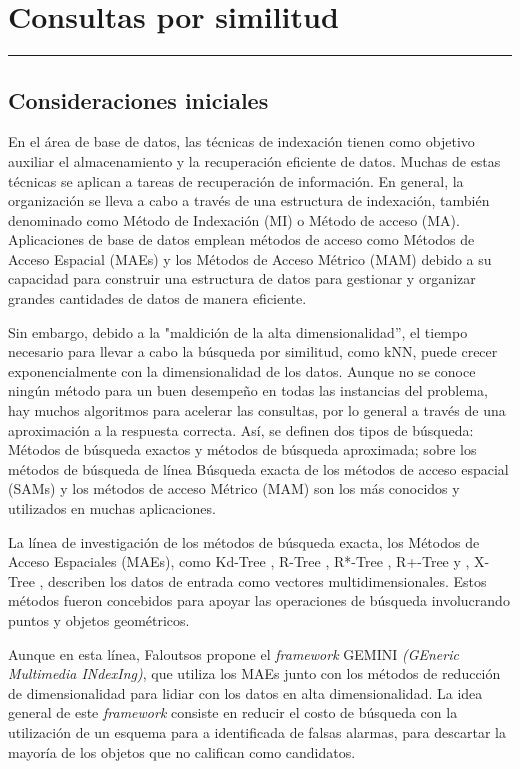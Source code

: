\chapter{Consultas por similitud}
\hrule \bigskip \vspace*{1cm}


\section{Consideraciones iniciales}

En el área de base de datos, las técnicas de indexación tienen como objetivo auxiliar el almacenamiento y la recuperación eficiente de datos. Muchas de estas técnicas se aplican a tareas de recuperación de información. En general, la organización se lleva a cabo a través de una estructura de indexación, también denominado como Método de Indexación (MI) o Método de acceso (MA). Aplicaciones de base de datos emplean métodos de acceso como Métodos de Acceso Espacial (MAEs) y los Métodos de Acceso Métrico (MAM) debido a su capacidad para construir una estructura de datos para gestionar y organizar grandes cantidades de datos de manera eficiente.

Sin embargo, debido a la "maldición de la alta dimensionalidad'', el tiempo necesario para llevar a cabo la búsqueda por similitud, como kNN, puede crecer exponencialmente con la dimensionalidad de los datos. Aunque no se conoce ningún método para un buen desempeño en todas las instancias del problema, hay muchos algoritmos para acelerar las consultas, por lo general a través de una aproximación a la respuesta correcta. Así, se definen dos tipos de búsqueda: Métodos de búsqueda exactos y métodos de búsqueda aproximada; sobre los métodos de búsqueda de línea Búsqueda exacta de los métodos de acceso espacial (SAMs) y los métodos de acceso Métrico (MAM) son los más conocidos y utilizados en muchas aplicaciones.

La línea de investigación de los métodos de búsqueda exacta, los Métodos de  Acceso Espaciales (MAEs), como Kd-Tree \cite{kdt}, R-Tree \cite{Guttman1984}, R*-Tree \cite{rstartree}, R+-Tree \cite{rplustree}  y , X-Tree \cite{xtree}, describen los datos de entrada como vectores multidimensionales. Estos métodos fueron concebidos para apoyar las operaciones de búsqueda involucrando puntos y objetos geométricos.

Aunque en esta línea, Faloutsos \cite{GEMINI_Faloutsos} propone el \textit{framework} GEMINI \textit{ (GEneric Multimedia INdexIng)}, que utiliza los MAEs junto con los métodos  de reducción de dimensionalidad para lidiar con los datos en alta dimensionalidad.  La idea general de este \textit{framework} consiste en reducir el costo de búsqueda con la utilización de un esquema para a identificada de falsas alarmas, para descartar la mayoría de los objetos que no califican como candidatos.

